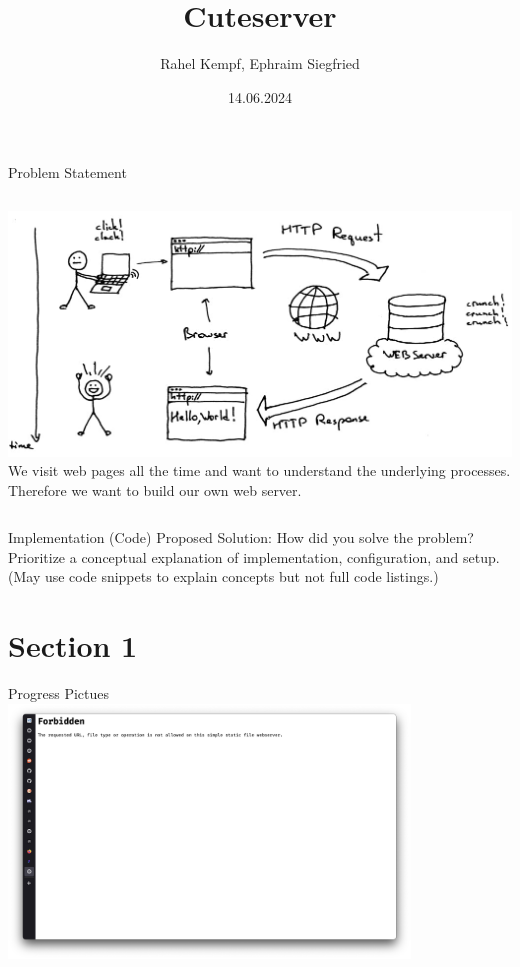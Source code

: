 \documentclass[aspectratio=169]{beamer}
\title              {Cuteserver}
\author             {Rahel Kempf, Ephraim Siegfried}
\institute          {Operating Systems, University of Basel}
\date               {14.06.2024}
\begin{document}
\begin{frame}[t,plain]
\titlepage
\end{frame}

\begin{frame}[c]{Problem Statement}
\begin{columns}[c]
        \includegraphics[width=\textwidth,height=\textheight,keepaspectratio]{webserver-comic.jpg}
   We visit web pages all the time and want to understand the underlying processes. Therefore we want to build our own web server.
\end{columns}
\end{frame}

\begin{frame}[c]{Implementation (Code)}
    Proposed Solution: How did you solve the problem? Prioritize a conceptual
    explanation of implementation, configuration, and setup. (May use code
    snippets to explain concepts but not full code listings.)
\end{frame}

\section{Section 1}	%

\begin{frame}[c]{Progress Pictues}
  \centering
  \includegraphics[width=0.8\textwidth,height=\textheight,keepaspectratio]{00_errors.png}
\end{frame}
\end{document}
